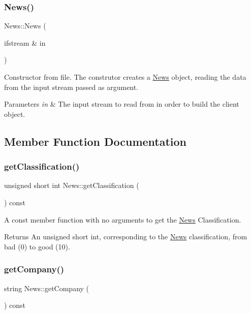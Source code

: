 \subsubsection{\texorpdfstring{News()}{News()}\hspace{0.1cm}{\footnotesize\ttfamily [3/3]}}
{\footnotesize\ttfamily News\+::\+News (\begin{DoxyParamCaption}\item[{ifstream \&}]{in }\end{DoxyParamCaption})}

Constructor from file. The construtor creates a \hyperlink{class_news}{News} object, reading the data from the input stream passed as argument. 
\begin{DoxyParams}{Parameters}
{\em in} & The input stream to read from in order to build the client object. \\
\hline
\end{DoxyParams}


\subsection{Member Function Documentation}
\hypertarget{class_news_a8a4ee8e5da2485868cd8b25105d55299}{}\label{class_news_a8a4ee8e5da2485868cd8b25105d55299} 
\subsubsection{\texorpdfstring{get\+Classification()}{getClassification()}}
{\footnotesize\ttfamily unsigned short int News\+::get\+Classification (\begin{DoxyParamCaption}{ }\end{DoxyParamCaption}) const}

A const member function with no arguments to get the \hyperlink{class_news}{News}\textquotesingle{} Classification. \begin{DoxyReturn}{Returns}
An unsigned short int, corresponding to the \hyperlink{class_news}{News} classification, from bad (0) to good (10). 
\end{DoxyReturn}
\hypertarget{class_news_aa95b12d89e76616f0fbfd34d4d6bfab6}{}\label{class_news_aa95b12d89e76616f0fbfd34d4d6bfab6} 
\subsubsection{\texorpdfstring{get\+Company()}{getCompany()}}
{\footnotesize\ttfamily string News\+::get\+Company (\begin{DoxyParamCaption}{ }\end{DoxyParamCaption}) const}

